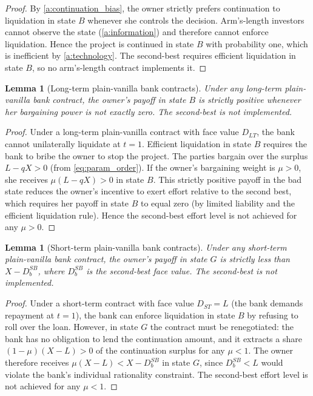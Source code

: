 \documentclass[12pt,a4paper]{article}
\theoremstyle{plain}
\newtheorem{lemma}[theorem]{Lemma}
\theoremstyle{definition}
\theoremstyle{remark}
\begin{document}
\begin{proof}
By \cref{a:continuation_bias}, the owner strictly prefers continuation to liquidation
in state $B$ whenever she controls the decision. Arm's-length investors cannot observe
the state (\cref{a:information}) and therefore cannot enforce liquidation. Hence the
project is continued in state $B$ with probability one, which is inefficient by
\cref{a:technology}. The second-best requires efficient liquidation in state $B$, so
no arm's-length contract implements it.
\end{proof}

\begin{lemma}[Long-term plain-vanilla bank contracts]
\label{l:lt_fails}
Under any long-term plain-vanilla bank contract, the owner's payoff in state $B$ is
strictly positive whenever her bargaining power is not exactly zero. The second-best
is not implemented.
\end{lemma}

\begin{proof}
Under a long-term plain-vanilla contract with face value $D_{LT}$, the bank cannot
unilaterally liquidate at $t=1$. Efficient liquidation in state $B$ requires the bank
to bribe the owner to stop the project. The parties bargain over the surplus
$L - qX > 0$ (from \cref{eq:param_order}). If the owner's bargaining weight is
$\mu > 0$, she receives $\mu(L - qX) > 0$ in state $B$. This strictly positive payoff
in the bad state reduces the owner's incentive to exert effort relative to the second
best, which requires her payoff in state $B$ to equal zero (by limited liability and
the efficient liquidation rule). Hence the second-best effort level is not achieved for
any $\mu > 0$.
\end{proof}

\begin{lemma}[Short-term plain-vanilla bank contracts]
\label{l:st_fails}
Under any short-term plain-vanilla bank contract, the owner's payoff in state $G$ is
strictly less than $X - D_b^{SB}$, where $D_b^{SB}$ is the second-best face value.
The second-best is not implemented.
\end{lemma}

\begin{proof}
Under a short-term contract with face value $D_{ST} = L$ (the bank demands repayment
at $t=1$), the bank can enforce liquidation in state $B$ by refusing to roll over the
loan. However, in state $G$ the contract must be renegotiated: the bank has no
obligation to lend the continuation amount, and it extracts a share $(1-\mu)(X-L) > 0$
of the continuation surplus for any $\mu < 1$. The owner therefore receives
$\mu(X-L) < X - D_b^{SB}$ in state $G$, since $D_b^{SB} < L$ would violate the
bank's individual rationality constraint. The second-best effort level is not achieved
for any $\mu < 1$.
\end{proof}
\end{document}
